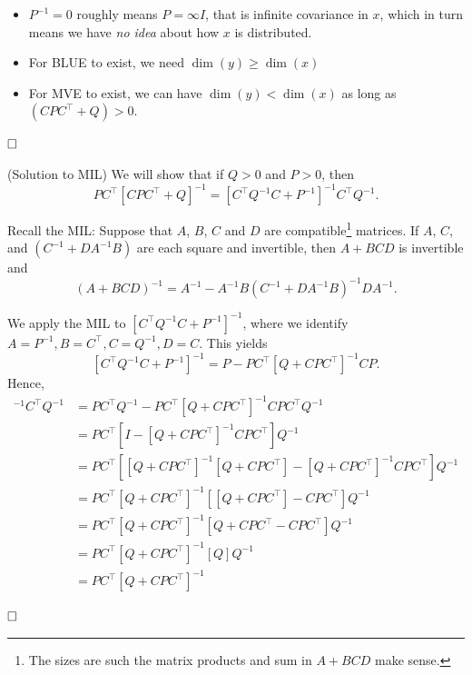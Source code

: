 \begin{rem}
\begin{enumerate}
\begin{itemize}
\item $P^{-1} = 0$ roughly means $P= \infty I$, that is infinite covariance in $x$, which in turn means we have \textit{no idea} about how $x$ is distributed.\\

    \item For BLUE to exist, we need $\dim(y) \ge \dim(x) $\\

    \item For MVE to exist, we can have $\dim(y) < \dim(x) $ as long as $(C P C^\top + Q) >0$.

\end{itemize}

\end{enumerate}

       
$\hfill \square$  \end{rem}

\begin{rem} (Solution to MIL) We will show that if $Q>0$ and $P>0$, then 
$$ PC^\top [CPC^\top +Q]^{-1}= [C^\top  Q^{-1}C+P^{-1}]^{-1}C^\top  Q^{-1}.$$

Recall the MIL: Suppose that $A$, $B$, $C$ and $D$ are compatible\footnote{The sizes are such the matrix products and sum in $A+BCD$ make sense.} matrices. If $A$, $C$, and  $(C^{-1}+D A^{-1}B)$ are each square and invertible, then  $A+BCD$ is invertible and
    $$ (A + BCD)^{-1} = A^{-1} - A^{-1}B(C^{-1} + DA^{-1}B)^{-1}DA^{-1}.$$

We apply the MIL to $[C^\top  Q^{-1}C+P^{-1}]^{-1}$, where we identify $A=P^{-1}, B=C^\top, C=Q^{-1}, D=C$. This yields
$$[C^\top  Q^{-1}C+P^{-1}]^{-1} = P-PC^\top [ Q + CPC^\top]^{-1} CP.$$
Hence,
\begin{align*}
[C^\top  Q^{-1}C+P^{-1}]^{-1}C^\top  Q^{-1} &= PC^\top  Q^{-1}-PC^\top [ Q + CPC^\top]^{-1} CPC^\top  Q^{-1} \\
&= PC^\top \left[ I - [Q+CPC^\top]^{-1} CPC^\top   \right] Q^{-1} \\
&={\scriptstyle  PC^\top \left[ [Q+CPC^\top]^{-1} [Q+CPC^\top] - [Q+CPC^\top]^{-1} CPC^\top   \right] Q^{-1}}\\
&=PC^\top [Q+CPC^\top]^{-1} \left[  [Q+CPC^\top] - CPC^\top   \right] Q^{-1}\\
&= PC^\top [Q+CPC^\top]^{-1} \left[  Q+CPC^\top - CPC^\top   \right] Q^{-1}\\
&= PC^\top [Q+CPC^\top]^{-1} \left[  Q    \right] Q^{-1}\\
&= PC^\top [Q+CPC^\top]^{-1}
\end{align*}

$\hfill \square$  
\end{rem}

